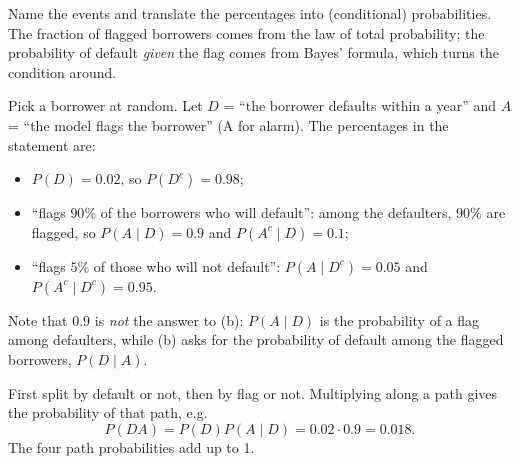 \begin{solution}
	\idea Name the events and translate the percentages into (conditional)
	probabilities. The fraction of flagged borrowers comes from the law of total
	probability; the probability of default \emph{given} the flag comes from
	Bayes' formula, which turns the condition around.

	 Pick a borrower at random. Let $D$ = ``the
	borrower defaults within a year'' and $A$ = ``the model flags the
	borrower'' (A for alarm).
	The percentages in the statement are:
	\begin{itemize}[nosep]
		\item $P(D)=0.02$, so $P(D^c)=0.98$;
		\item ``flags $90\%$ of the borrowers who will default'': among the
		      defaulters, $90\%$ are flagged, so $P(A\mid D)=0.9$ and
		      $P(A^c\mid D)=0.1$;
		\item ``flags $5\%$ of those who will not default'': $P(A\mid D^c)=0.05$
		      and $P(A^c\mid D^c)=0.95$.
	\end{itemize}
	Note that $0.9$ is \emph{not} the answer to (b): $P(A\mid D)$ is the
	probability of a flag among defaulters, while (b) asks for the probability
	of default among the flagged borrowers, $P(D\mid A)$.

	\begin{minipage}{.5\linewidth}
		 First split by default or not, then by flag or not.
		Multiplying along a path gives the probability of that path, e.g.\
		\[ P(DA)=P(D)P(A\mid D)=0.02\cdot0.9=0.018. \]
		The four path probabilities add up to 1.
	\end{minipage}\hfill
	\begin{minipage}{.46\linewidth}
		\centering
	\end{minipage}


\end{solution}
